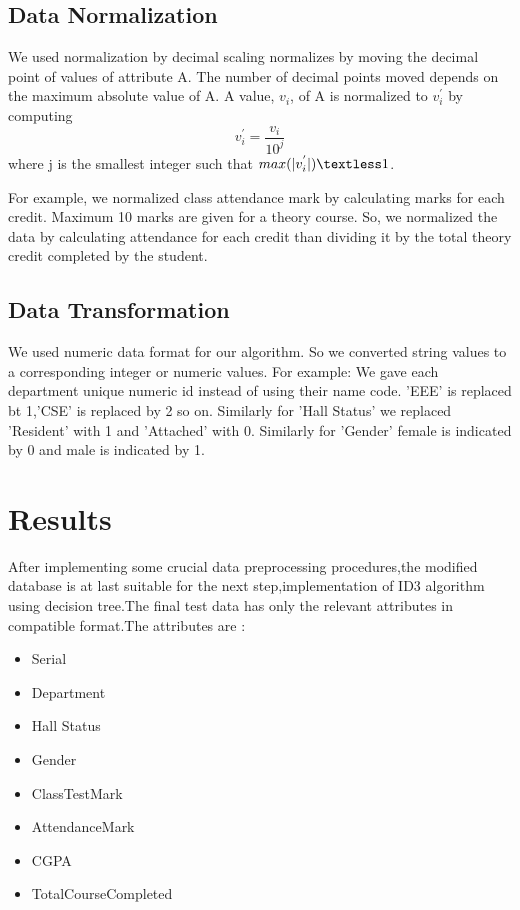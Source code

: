 \subsection{Data Normalization}
We used normalization by decimal scaling normalizes by moving the decimal point of values of attribute A. The
number of decimal points moved depends on the maximum absolute value of A. A value, $v_i$, of A is normalized
to $v^{'}_i$ by computing $$ v^{'}_i = \dfrac{v_i}{10^{j}} $$
where j is the smallest integer such that $ max(|v^{'}_i|) \textless 1$.

For example, we normalized class attendance mark by calculating marks for each credit. Maximum 10 marks are given for a theory course. So, we normalized the data by calculating attendance for each credit than dividing it by the total theory credit completed by the student.
\newpage
\subsection{Data Transformation}
We used numeric data format for our algorithm. So we converted string values to a corresponding integer or numeric values.
For example: We gave each department unique numeric id instead of using their name code. 'EEE' is replaced bt 1,'CSE'
is replaced by 2 so on.
Similarly for 'Hall Status' we replaced 'Resident' with 1 and 'Attached' with 0. 
Similarly for 'Gender'  female is indicated by 0 and male is indicated by 1.


\section{Results}

After implementing some crucial data preprocessing procedures,the modified database is at last suitable for the next step,implementation of ID3 algorithm using decision tree.The final test data has only the relevant attributes in compatible format.The attributes are :
\begin{itemize}
\item Serial
\item Department
\item Hall Status
\item Gender
\item ClassTestMark
\item AttendanceMark
\item CGPA
\item  TotalCourseCompleted
\end{itemize} 